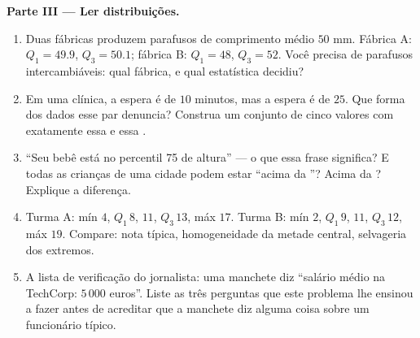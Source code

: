 \begin{problem}
\medskip
\noindent\textbf{Parte III --- Ler distribuições.}
\begin{enumerate}[resume]
  \item Duas fábricas produzem parafusos de comprimento médio
        $50$ mm. Fábrica A: $Q_1 = 49.9$, $Q_3 = 50.1$; fábrica
        B: $Q_1 = 48$, $Q_3 = 52$. Você precisa de parafusos
        intercambiáveis: qual fábrica, e qual estatística
        decidiu?
  \item Em uma clínica, a espera  é de $10$ minutos, mas a
        espera  é de $25$. Que forma dos dados esse par
        denuncia? Construa um conjunto de cinco valores com
        exatamente essa  e essa .
  \item ``Seu bebê está no percentil 75 de altura'' --- o que
        essa frase significa? E todas as crianças de uma cidade
        podem estar ``acima da ''? Acima da ?
        Explique a diferença.
  \item Turma A: mín $4$, $Q_1\,8$,  $11$, $Q_3\,13$, máx
        $17$. Turma B: mín $2$, $Q_1\,9$,  $11$,
        $Q_3\,12$, máx $19$. Compare: nota típica, homogeneidade
        da metade central, selvageria dos extremos.
  \item A lista de verificação do jornalista: uma manchete diz
        ``salário médio na TechCorp: $5\,000$ euros''. Liste as
        três perguntas que este problema lhe ensinou a fazer
        antes de acreditar que a manchete diz alguma coisa sobre
        um funcionário típico.
\end{enumerate}


\end{problem}
